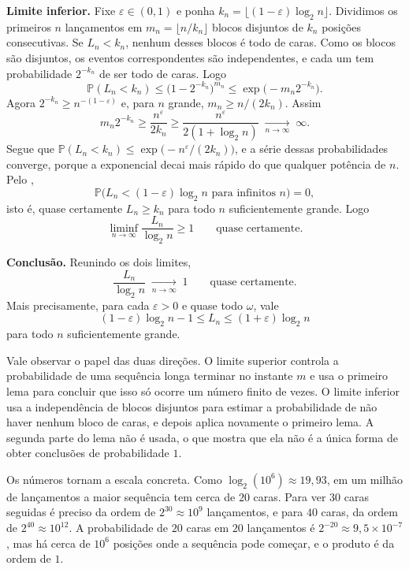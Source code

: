\documentclass[12pt,portuguese]{article}
\theoremstyle{definition}
\theoremstyle{plainexercise}
\theoremstyle{starredexercise}
\theoremstyle{definition}
\begin{document}
\smallskip
\noindent\textbf{Limite inferior.}
Fixe $\varepsilon\in(0,1)$ e ponha
$k_n=\lfloor(1-\varepsilon)\log_2 n\rfloor$. Dividimos os primeiros $n$
lançamentos em $m_n=\lfloor n/k_n\rfloor$ blocos disjuntos de $k_n$ posições
consecutivas. Se $L_n<k_n$, nenhum desses blocos é todo de caras. Como os
blocos são disjuntos, os eventos correspondentes são independentes, e cada um
tem probabilidade $2^{-k_n}$ de ser todo de caras. Logo
\[
\mathbb{P}(L_n<k_n)
\leqslant
\bigl(1-2^{-k_n}\bigr)^{m_n}
\leqslant
\exp\bigl(-m_n2^{-k_n}\bigr).
\]
Agora $2^{-k_n}\geqslant n^{-(1-\varepsilon)}$ e, para $n$ grande,
$m_n\geqslant n/(2k_n)$. Assim
\[
m_n2^{-k_n}
\geqslant
\frac{n^{\varepsilon}}{2k_n}
\geqslant
\frac{n^{\varepsilon}}{2(1+\log_2 n)}
\;\xrightarrow[n\to\infty]{}\;\infty.
\]
Segue que $\mathbb{P}(L_n<k_n)\leqslant\exp\bigl(-n^{\varepsilon}/(2k_n)\bigr)$,
e a série dessas probabilidades converge, porque a exponencial decai mais
rápido do que qualquer potência de $n$. Pelo ,
\[
\mathbb{P}\bigl(L_n<(1-\varepsilon)\log_2 n
\text{ para infinitos }n\bigr)=0,
\]
isto é, quase certamente $L_n\geqslant k_n$ para todo $n$ suficientemente
grande. Logo
\[
\liminf_{n\to\infty}\frac{L_n}{\log_2 n}\geqslant1
\qquad
\text{quase certamente}.
\]

\smallskip
\noindent\textbf{Conclusão.}
Reunindo os dois limites,
\begin{equation}\label{eq:maior-sequencia}
\frac{L_n}{\log_2 n}\;\xrightarrow[n\to\infty]{}\;1
\qquad
\text{quase certamente}.
\end{equation}
Mais precisamente, para cada $\varepsilon>0$ e quase todo $\omega$, vale
\[
(1-\varepsilon)\log_2 n-1\leqslant L_n\leqslant(1+\varepsilon)\log_2 n
\]
para todo $n$ suficientemente grande.

Vale observar o papel das duas direções. O limite superior controla a
probabilidade de uma sequência longa terminar no instante $m$ e usa o primeiro
lema para concluir que isso só ocorre um número finito de vezes. O limite
inferior usa a independência de blocos disjuntos para estimar a probabilidade de
não haver nenhum bloco de caras, e depois aplica novamente o primeiro lema. A
segunda parte do lema não é usada, o que mostra que ela não é a única forma de
obter conclusões de probabilidade $1$.

Os números tornam a escala concreta. Como $\log_2(10^6)\approx19{,}93$, em um
milhão de lançamentos a maior sequência tem cerca de $20$ caras. Para ver $30$
caras seguidas é preciso da ordem de $2^{30}\approx10^9$ lançamentos, e para
$40$ caras, da ordem de $2^{40}\approx10^{12}$. A probabilidade de $20$ caras
em $20$ lançamentos é $2^{-20}\approx9{,}5\times10^{-7}$, mas há cerca de
$10^6$ posições onde a sequência pode começar, e o produto é da ordem de $1$.
\end{document}
